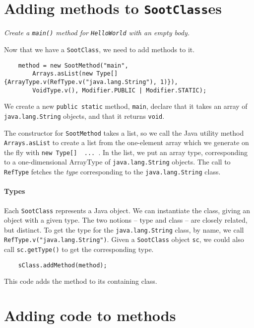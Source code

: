 \documentclass{article}
\begin{document}
\section{Adding methods to {\tt SootClass}es}

{\em Create a {\tt main()} method for {\tt HelloWorld} with an empty body.} 

Now that we have a {\tt SootClass}, we need to add methods to it.

\noindent
\begin{verbatim}
    method = new SootMethod("main",                 
        Arrays.asList(new Type[] {ArrayType.v(RefType.v("java.lang.String"), 1)}),
        VoidType.v(), Modifier.PUBLIC | Modifier.STATIC); 
\end{verbatim}

We create a new {\tt public static} method, {\tt main}, declare that it takes
an array of {\tt java.lang.String} objects, and that it returns {\tt void}.

The constructor for {\tt SootMethod} takes a list, so we call the Java
utility method {\tt Arrays.asList} to create a list from the
one-element array which we generate on the fly with
{\tt new Type[] { ... }}.  In the list, we put an array type,
corresponding to a one-dimensional ArrayType of {\tt java.lang.String}
objects.  The call to {\tt RefType} fetches the {\em type}
corresponding to the {\tt java.lang.String} class.

\paragraph{Types} Each {\tt SootClass} represents a Java object.  We can
instantiate the class, giving an object with a given type.  The two
notions -- type and class -- are closely related, but distinct.  To
get the type for the {\tt java.lang.String} class, by name, we call
{\tt RefType.v("java.lang.String")}.  Given a {\tt SootClass} object
{\tt sc}, we could also call {\tt sc.getType()} to get the
corresponding type.

\noindent
\begin{verbatim}    sClass.addMethod(method); \end{verbatim}

This code adds the method to its containing class.

\section{Adding code to methods}
\end{document}
